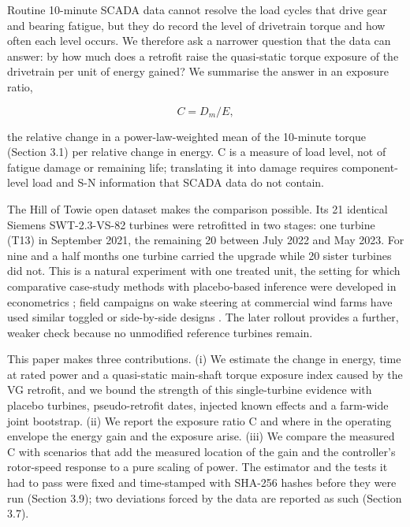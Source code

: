 \documentclass[preprint,12pt]{elsarticle}
\begin{document}
Routine 10-minute SCADA data cannot resolve the load cycles that drive gear and bearing fatigue, but they do record the level of drivetrain torque and how often each level occurs. We therefore ask a narrower question that the data can answer: by how much does a retrofit raise the quasi-static torque exposure of the drivetrain per unit of energy gained? We summarise the answer in an exposure ratio,

\begin{equation}
C = D_{m} / E ,
\label{eq:C}
\end{equation}

the relative change in a power-law-weighted mean of the 10-minute torque (Section 3.1) per relative change in energy. C is a measure of load level, not of fatigue damage or remaining life; translating it into damage requires component-level load and S-N information that SCADA data do not contain.

The Hill of Towie open dataset \cite{hot} makes the comparison possible. Its 21 identical Siemens SWT-2.3-VS-82 turbines were retrofitted in two stages: one turbine (T13) in September 2021, the remaining 20 between July 2022 and May 2023. For nine and a half months one turbine carried the upgrade while 20 sister turbines did not. This is a natural experiment with one treated unit, the setting for which comparative case-study methods with placebo-based inference were developed in econometrics \cite{abadie10,abadie21,conley11}; field campaigns on wake steering at commercial wind farms have used similar toggled or side-by-side designs \cite{fleming19}. The later rollout provides a further, weaker check because no unmodified reference turbines remain.

This paper makes three contributions. (i) We estimate the change in energy, time at rated power and a quasi-static main-shaft torque exposure index caused by the VG retrofit, and we bound the strength of this single-turbine evidence with placebo turbines, pseudo-retrofit dates, injected known effects and a farm-wide joint bootstrap. (ii) We report the exposure ratio C and where in the operating envelope the energy gain and the exposure arise. (iii) We compare the measured C with scenarios that add the measured location of the gain and the controller's rotor-speed response to a pure scaling of power. The estimator and the tests it had to pass were fixed and time-stamped with SHA-256 hashes before they were run (Section 3.9); two deviations forced by the data are reported as such (Section 3.7).
\end{document}

